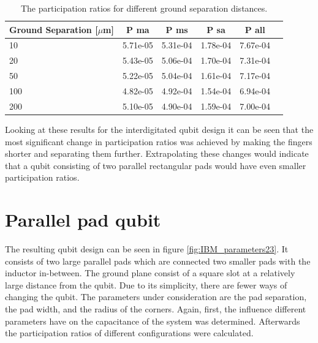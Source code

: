\begin{table}
	\begin{center}
		\begin{tabular}{ | l || c | c | c | c | c |}
			\hline
			Ground Separation [\(\mu\)m] & P ma & P ms & P sa & P all \\ \hline
			10 & 5.71e-05 & 5.31e-04 & 1.78e-04 & 7.67e-04 \\
			20 & 5.43e-05 & 5.06e-04 & 1.70e-04 & 7.31e-04 \\
			50 & 5.22e-05 & 5.04e-04 & 1.61e-04 & 7.17e-04 \\
			100 & 4.82e-05 & 4.92e-04 & 1.54e-04 & 6.94e-04 \\
			200 & 5.10e-05 & 4.90e-04 & 1.59e-04 & 7.00e-04\\
			\hline
		\end{tabular}
	\end{center}
	\caption{The participation ratios for different ground separation distances.}
	\label{table:ratio_groundseparation}
\end{table}

Looking at these results for the interdigitated qubit design it can be seen that the most significant change in participation ratios was achieved by making the fingers shorter and separating them further. Extrapolating these changes would indicate that a qubit consisting of two parallel rectangular pads would have even smaller participation ratios.


\clearpage
\section{Parallel pad qubit}
The resulting qubit design can be seen in figure \ref{fig:IBM_parameters23}. It consists of two large parallel pads which are connected two smaller pads with the inductor in-between. The ground plane consist of a square slot at a relatively large distance from the qubit. Due to its simplicity, there are fewer ways of changing the qubit. The parameters under consideration are the pad separation, the pad width, and the radius of the corners. Again, first, the influence different parameters have on the capacitance of the system was determined. Afterwards the participation ratios of different configurations were calculated.

